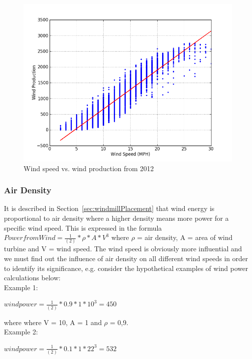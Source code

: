 \begin{figure}[H]
\centering
\includegraphics[width=0.99\linewidth,natwidth=898,natheight=587]{billeder/WindSpeedVsProduction.png}
\caption{Wind speed vs. wind production from 2012}
\label{fig:windVsProd}
\end{figure}

\subsubsection{Air Density}
\label{sec:airDensity}
It is described in Section~\ref{sec:windmillPlacement} that wind energy is proportional to air density where a higher density means more power for a specific wind speed. This is expressed in the formula $Power from Wind=\frac{1}{(2)}*\rho*A*V^3$ where $\rho$ = air density, A = area of wind turbine and V = wind speed. The wind speed is obviously more influential and we must find out the influence of air density on all different wind speeds in order to identify its significance, e.g. consider the hypothetical examples of wind power calculations below:
\\[0.5cm]
\noindent Example 1:

\begin{center}
$wind power = \frac{1}{(2)}*0.9*1*10^3 = 450$
\end{center}

\noindent where where V = 10, A = 1 and $\rho$ =  0,9.
\\[0.5cm]
\noindent Example 2: 

\begin{center}
$wind power = \frac{1}{(2)}*0.1*1*22^3 = 532$
\end{center}

